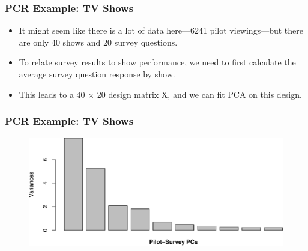 \documentclass[
  shownotes,
  xcolor={svgnames},
  hyperref={colorlinks,citecolor=DarkBlue,linkcolor=DarkRed,urlcolor=DarkBlue}
  , aspectratio=169]{beamer}
\begin{document}
\begin{frame}[fragile]
\frametitle{PCR Example: TV Shows}

\begin{itemize}
  \item It might seem like there is a lot of data here—6241 pilot viewings—but there are only 40 shows and 20 survey questions. 
  \medskip
  \item To relate survey results to show performance, we need to first calculate the average survey question response by show. 
  \medskip
  \item This leads to a 40 × 20 design matrix X, and we can fit PCA on this design.

\end{itemize}
\end{frame}
\begin{frame}[fragile]
\frametitle{PCR Example: TV Shows}


 \begin{figure}[H] \centering
            \captionsetup{justification=centering}
              \includegraphics[scale=.5]{figures/unnamed-chunk-3-1.pdf}
 \end{figure}



\end{frame}
\end{document}
